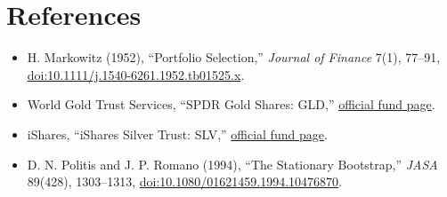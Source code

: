 \section{References}\label{sec:references}

\begin{itemize}
  \item H. Markowitz (1952), ``Portfolio Selection,'' \emph{Journal of Finance} 7(1), 77--91,
  \href{https://doi.org/10.1111/j.1540-6261.1952.tb01525.x}{doi:10.1111/j.1540-6261.1952.tb01525.x}.
  \item World Gold Trust Services, ``SPDR Gold Shares: GLD,''
  \href{https://www.spdrgoldshares.com/usa/gld/}{official fund page}.
  \item iShares, ``iShares Silver Trust: SLV,''
  \href{https://www.ishares.com/us/products/239855/ishares-silver-trust-fund}{official fund page}.
  \item D. N. Politis and J. P. Romano (1994), ``The Stationary Bootstrap,'' \emph{JASA} 89(428),
  1303--1313, \href{https://doi.org/10.1080/01621459.1994.10476870}{doi:10.1080/01621459.1994.10476870}.
\end{itemize}
